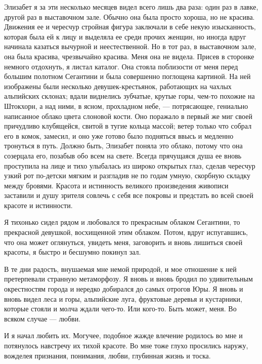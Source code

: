 Элизабет я  за эти несколько месяцев  видел всего лишь два  раза: один
раз в  лавке, другой раз  в выставочном  зале. Обычно она  была просто
хороша,  но  не  красива.  Движения  ее  и  чересчур  стройная  фигура
заключали в себе некую изысканность, которая была ей к лицу и выделяла
ее среди прочих  женщин, но иногда вдруг начинала  казаться вычурной и
неестественной. Но  в тот раз,  в выставочном зале, она  была красива,
чрезвычайно красива.  Меня она  не видела.  Присев в  сторонке немного
отдохнуть,  я листал  каталог.  Она стояла  поблизости  от меня  перед
большим полотном  Сегантини и  была совершенно поглощена  картиной. На
ней изображены были несколько девушек-крестьянок, работающих на чахлых
альпийских  склонах; вдали  виднелись  зубчатые,  крутые горы,  чем-то
похожие  на  Штокхорн, а  над  ними,  в  ясном, прохладном  небе,  ---
потрясающее,  гениально написанное  облако цвета  слоновой кости.  Оно
поражало в первый  же миг своей причудливо клубящейся,  свитой в тугие
кольца массой; ветер только что собрал его в комок, замесил, и оно уже
готово было подняться ввысь и  медленно тронуться в путь. Должно быть,
Элизабет поняла это облако, потому  что она созерцала его, позабыв обо
всем на  свете. Всегда прячущаяся душа  ее вновь проступила на  лице и
тихо  улыбалась из  широко открытых  глаз, сделав  чересчур узкий  рот
по-детски мягким и разгладив не по годам умную, скорбную складку между
бровями. Красота и истинность великого произведения живописи заставили
и душу  зрителя совлечь с себя  все покровы и предстать  во всей своей
красоте и истинности.

Я тихонько  сидел рядом и  любовался то прекрасным  облаком Сегантини,
то  прекрасной  девушкой,  восхищенной   этим  облаком.  Потом,  вдруг
испугавшись,  что она  может  оглянуться, увидеть  меня, заговорить  и
вновь лишиться своей красоты, я быстро и бесшумно покинул зал.

В те  дни радость,  внушаемая мне  немой природой,  и мое  отношение к
ней  претерпевали странную  метаморфозу.  Я вновь  и  вновь бродил  по
удивительным окрестностям города и  нередко добирался до самых отрогов
Юры. Я  вновь и вновь  видел леса  и горы, альпийские  луга, фруктовые
деревья  и  кустарники, которые  стояли  и  молча ждали  чего-то.  Или
кого-то. Быть может, меня. Во всяком случае --- любви.

И я начал любить их. Могучее,  подобное жажде влечение родилось во мне
и потянулось навстречу  их тихой красоте. Во мне  тоже глухо просились
наружу, вожделея признания, понимания, любви, глубинная жизнь и тоска.


